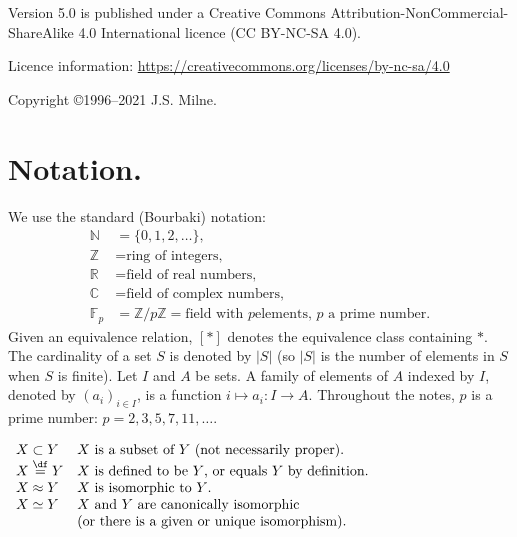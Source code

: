 \documentclass[a4paper,11pt,final,openany]{memoir}
\theoremstyle{nonumberplain}
\begin{document}
\vfill

\noindent Version 5.0 is published under a Creative Commons
Attribution-NonCommercial-ShareAlike 4.0 International licence
(CC BY-NC-SA 4.0).

\bigskip

\noindent Licence information:
\href{https://creativecommons.org/licenses/by-nc-sa/4.0/}{https://creativecommons.org/licenses/by-nc-sa/4.0}

\bigskip
\noindent Copyright \copyright 1996--2021 J.S. Milne.

\setcounter{page}{2} \clearpage \pagestyle{plain} \vspace*{0in}

\tableoc\clearpage


\section{Notation.}

\sloppy We use the standard (Bourbaki) notation:
\begin{align*}
\mathbb{N}  &  =\{0,1,2,\ldots\},\\
\mathbb{Z}  &  =\text{ring of integers,}\\
\mathbb{R}{}  &  =\text{field of real numbers,}\\
\mathbb{C}{}  &  =\text{field of complex numbers,}\\
\mathbb{F}_{p}  &  =\mathbb{Z}{}/p\mathbb{Z}{}=\text{field with }p\text{
elements, }p\text{ a prime number.}%
\end{align*}
Given an equivalence relation, $[\ast]$ denotes the equivalence class
containing $\ast$. The cardinality of a set $S$ is denoted by $\left\vert
S\right\vert $ (so $\left\vert S\right\vert $ is the number of elements in
$S$when $S$ is finite). Let $I$ and $A$ be sets. A family of elements of $A$
indexed by $I$, denoted by $(a_{i})_{i\in I}$, is a function $i\mapsto
a_{i}\colon I\rightarrow A$. Throughout the notes, $p$ is a prime number:
$p=2,3,5,7,11,\ldots$.

$%
\begin{array}
[c]{ll}%
X\subset Y & X\text{ is a subset of }Y\text{ (not necessarily proper).}\\
X\overset{\df}{=}Y & X\text{ is defined to be }Y\text{, or
equals }Y\text{ by definition.}\\
X\approx Y & X\text{ is isomorphic to }Y\text{.}\\
X\simeq Y & X\text{ and }Y\text{ are canonically isomorphic}\\
  & \text{(or there is a
given or unique isomorphism).}%
\end{array}
$
\end{document}
